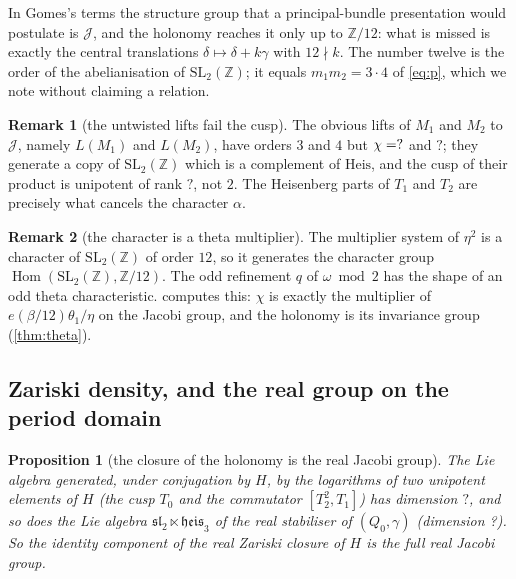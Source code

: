 \documentclass[11pt,a4paper]{article}
\newcommand{\SSGaChiLeviTwo}{?}\newcommand{\SSGaLeviRank}{?}\newcommand{\SSGaWordHOne}{?}
\newcommand{\SSGaZariskiDim}{?}\newcommand{\SSGaStabDim}{?}\newcommand{\SSGaOrbitDim}{?}
\newcommand{\ZZ}{\mathbb{Z}}
\newcommand{\SL}{\mathrm{SL}}
\theoremstyle{plain}
\newtheorem{proposition}{Proposition}
\theoremstyle{definition}
\newtheorem{remark}{Remark}
\begin{document}
In Gomes's terms the structure group that a principal-bundle presentation would postulate is
$\mathcal J$, and the holonomy reaches it only up to $\ZZ/12$: what is missed is exactly
the central translations $\delta\mapsto\delta+k\gamma$ with $12\nmid k$. The number twelve
is the order of the abelianisation of $\SL_2(\ZZ)$; it equals $m_1m_2=3\cdot4$ of \cref{eq:p}, which we note without
claiming a relation.

\begin{remark}[the untwisted lifts fail the cusp]
\label{rem:gauge-levi}
The obvious lifts of $M_1$ and $M_2$ to $\mathcal J$, namely $L(M_1)$ and $L(M_2)$, have orders $3$ and $4$ but
$\chi=?$ and $\SSGaChiLeviTwo$; they generate a copy of $\SL_2(\ZZ)$ which is a
complement of $\mathrm{Heis}$, and the cusp of their product is unipotent of rank
$\SSGaLeviRank$, not $2$. The Heisenberg parts of $T_1$ and $T_2$ are precisely what
cancels the character $\alpha$.
\end{remark}

\begin{remark}[the character is a theta multiplier]
\label{rem:gauge-eta}
The multiplier system of $\eta^2$ is a character of $\SL_2(\ZZ)$ of order $12$, so it
generates the character group $\operatorname{Hom}(\SL_2(\ZZ),\ZZ/12)$. The odd refinement $q$ of $\omega\bmod2$ has the shape of an
odd theta characteristic.  computes this: $\chi$ is exactly the multiplier of $e(\beta/12)\theta_1/\eta$ on the
Jacobi group, and the holonomy is its invariance group (\cref{thm:theta}).
\end{remark}

\subsection{Zariski density, and the real group on the period domain}

\begin{proposition}[the closure of the holonomy is the real Jacobi group]
\label{prop:gauge-zariski}
The Lie algebra generated, under conjugation by $H$, by the logarithms of two unipotent
elements of $H$ (the cusp $T_0$ and the commutator $[T_2^2,T_1]$) has dimension
$\SSGaZariskiDim$, and so does the Lie algebra $\mathfrak{sl}_2\ltimes\mathfrak{heis}_3$ of the real
stabiliser of $(Q_0,\gamma)$ (dimension \SSGaStabDim). So the identity
component of the real Zariski closure of $H$ is the full real Jacobi group.
\end{proposition}
\end{document}
